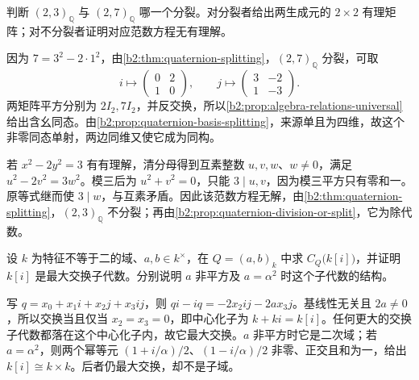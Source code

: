 \begin{exercise}\label{b2:ex:17-rational-quaternions}
	判断 \((2,3)_{\mathbb Q}\) 与 \((2,7)_{\mathbb Q}\) 哪一个分裂。对分裂者给出两生成元的 \(2\times2\) 有理矩阵；对不分裂者证明对应范数方程无有理解。
\end{exercise}
\begin{solution}
	因为 \(7=3^2-2\cdot1^2\)，由\cref{b2:thm:quaternion-splitting}，\((2,7)_{\mathbb Q}\) 分裂，可取
	\[
		i\longmapsto\begin{pmatrix}0&2\\1&0\end{pmatrix},\qquad
		j\longmapsto\begin{pmatrix}3&-2\\1&-3\end{pmatrix}.
	\]
	两矩阵平方分别为 \(2I_2,7I_2\)，并反交换，所以\cref{b2:prop:algebra-relations-universal}给出含幺同态。由\cref{b2:prop:quaternion-basis-splitting}，来源单且为四维，故这个非零同态单射，两边同维又使它成为同构。

	若 \(x^2-2y^2=3\) 有有理解，清分母得到互素整数 \(u,v,w\)、\(w\ne0\)，满足 \(u^2-2v^2=3w^2\)。模三后为 \(u^2+v^2=0\)，只能 \(3\mid u,v\)，因为模三平方只有零和一。原等式继而使 \(3\mid w\)，与互素矛盾。因此该范数方程无解，由\cref{b2:thm:quaternion-splitting}，\((2,3)_{\mathbb Q}\) 不分裂；再由\cref{b2:prop:quaternion-division-or-split}，它为除代数。
\end{solution}

\begin{exercise}\label{b2:ex:17-quaternion-quadratic-centralizer}
	设 \(k\) 为特征不等于二的域、\(a,b\in k^\times\)，在 \(Q=(a,b)_k\) 中求 \(C_Q\bigl(k[i]\bigr)\)，并证明 \(k[i]\) 是最大交换子代数。分别说明 \(a\) 非平方及 \(a=\alpha^2\) 时这个子代数的结构。
\end{exercise}
\begin{solution}
	写 \(q=x_0+x_1i+x_2j+x_3ij\)，则 \(qi-iq=-2x_2ij-2a x_3j\)。基线性无关且 \(2a\ne0\)，所以交换当且仅当 \(x_2=x_3=0\)，即中心化子为 \(k+ki=k[i]\)。任何更大的交换子代数都落在这个中心化子内，故它最大交换。\(a\) 非平方时它是二次域；若 \(a=\alpha^2\)，则两个幂等元 \((1+i/\alpha)/2\)、\((1-i/\alpha)/2\) 非零、正交且和为一，给出 \(k[i]\cong k\times k\)。后者仍最大交换，却不是子域。
\end{solution}

